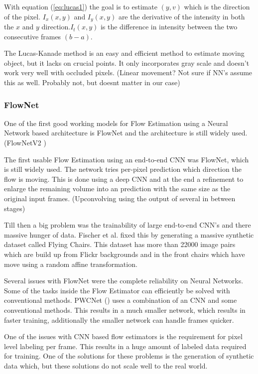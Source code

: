 \documentclass{article}
\begin{document}
With equation (\ref{eq:lucas1}) the goal is to estimate $(y, v)$ which is the direction of the pixel. $I_x(x, y)$ and $I_y(x, y)$ are the derivative of the intensity in both the $x$ and $y$ direction.$I_t(x, y)$ is the difference in intensity between the two consecutive frames $(b-a)$.

The Lucas-Kanade method is an easy and efficient method to estimate moving object, but it lacks on crucial points. It only incorporates gray scale and doesn't work very well with occluded pixels. (Linear movement? Not sure if NN's assume this as well. Probably not, but doesnt matter in our case)

\subsubsection{FlowNet}
One of the first good working models for Flow Estimation using a Neural Network based architecture is FlowNet \cite{fischer_flownet_2015} and the architecture is still widely used. (FlowNetV2 \cite{ilg_flownet_2016})

The first usable Flow Estimation using an end-to-end CNN was FlowNet, which is still widely used. The network tries per-pixel prediction which direction the flow is moving. This is done using a deep CNN and at the end a refinement to enlarge the remaining volume into an prediction with the same size as the original input frames. (Upconvolving using the output of several in between stages)

Till then a big problem was the trainability of large end-to-end CNN's and there massive hunger of data. Fischer et al. fixed this by generating a massive synthetic dataset called Flying Chairs. This dataset has more than 22000 image pairs which are build up from Flickr backgrounds and in the front chairs which have move using a random affine transformation.





Several issues with FlowNet were the complete reliability on Neural Networks. Some of the tasks inside the Flow Estimator can efficiently be solved with conventional methods. PWCNet (\cite{sun_pwc-net_2018}) uses a combination of an CNN and some conventional methods. This results in a much smaller network, which results in faster training, additionally the smaller network can handle frames quicker.

One of the issues with CNN based flow estimators is the requirement for pixel level labeling per frame. This results in a huge amount of labeled data required for training. One of the solutions for these problems is the generation of synthetic data which, but these solutions do not scale well to the real world.
\end{document}
